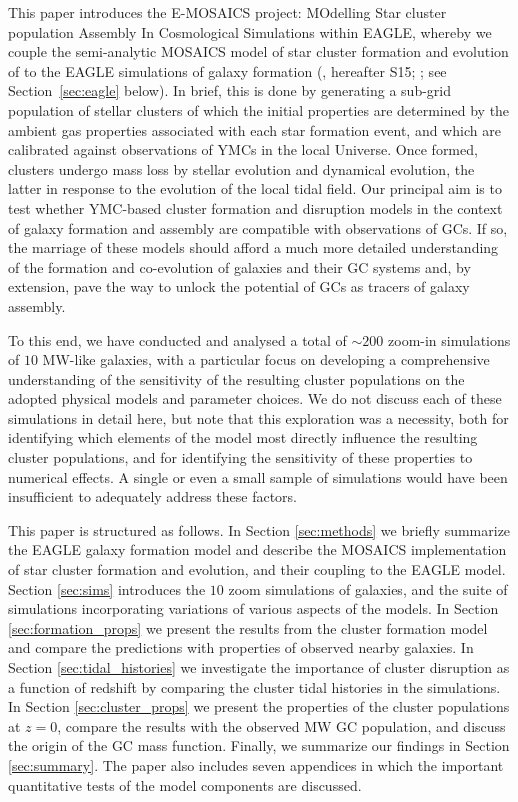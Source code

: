 \documentclass[fleqn,usenatbib]{mnras}
\newcommand{\numgal}{10}
\newcommand{\numsim}{\sim 200}
\begin{document}
This paper introduces the E-MOSAICS project: MOdelling Star cluster population Assembly In Cosmological Simulations within EAGLE, whereby we couple the semi-analytic {\sc MOSAICS} model of star cluster formation and evolution of  \citet[see Section~\ref{sec:mosaics} below]{Kruijssen_et_al_11, Kruijssen_et_al_12} to the EAGLE simulations of galaxy formation (\citealt{S15}, hereafter S15; \citealt{C15}; see Section~\ref{sec:eagle} below). In brief, this is done by generating a sub-grid population of stellar clusters of which the initial properties are determined by the ambient gas properties associated with each star formation event, and which are calibrated against observations of YMCs in the local Universe. Once formed, clusters undergo mass loss by stellar evolution and dynamical evolution, the latter in response to the evolution of the local tidal field. Our principal aim is to test whether YMC-based cluster formation and disruption models in the context of galaxy formation and assembly are compatible with observations of GCs. If so, the marriage of these models should afford a much more detailed understanding of the formation and co-evolution of galaxies and their GC systems and, by extension, pave the way to unlock the potential of GCs as tracers of galaxy assembly.

To this end, we have conducted and analysed a total of $\numsim$ zoom-in simulations of $\numgal$ MW-like galaxies, with a particular focus on developing a comprehensive understanding of the sensitivity of the resulting cluster populations on the adopted physical models and parameter choices. We do not discuss each of these simulations in detail here, but note that this exploration was a necessity, both for identifying which elements of the model most directly influence the resulting cluster populations, and for identifying the sensitivity of these properties to numerical effects. A single or even a small sample of simulations would have been insufficient to adequately address these factors.

This paper is structured as follows. In Section \ref{sec:methods} we briefly summarize the EAGLE galaxy formation model and describe the MOSAICS implementation of star cluster formation and evolution, and their coupling to the EAGLE model. Section \ref{sec:sims} introduces the $\numgal$ zoom simulations of galaxies, and the suite of simulations incorporating variations of various aspects of the models. In Section \ref{sec:formation_props} we present the results from the cluster formation model and compare the predictions with properties of observed nearby galaxies. In Section \ref{sec:tidal_histories} we investigate the importance of cluster disruption as a function of redshift by comparing the cluster tidal histories in the simulations. In Section \ref{sec:cluster_props} we present the properties of the cluster populations at $z=0$, compare the results with the observed MW GC population, and discuss the origin of the GC mass function. Finally, we summarize our findings in Section \ref{sec:summary}. The paper also includes seven appendices in which the important quantitative tests of the model components are discussed.
\end{document}
